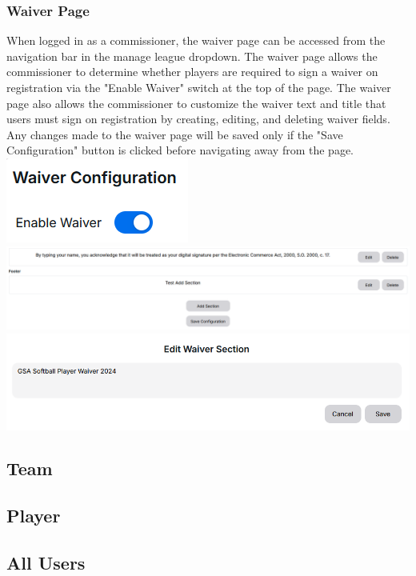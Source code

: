 \documentclass{article}
\begin{document}
            \subsubsection{Waiver Page}
                When logged in as a commissioner, the waiver page can be accessed
                from the navigation bar in the manage league dropdown. The waiver page 
                allows the commissioner to determine whether players are required to sign
                a waiver on registration via the "Enable Waiver" switch at the top of the 
                page. The waiver page also allows the commissioner to customize the waiver
                text and title that users must sign on registration by creating, editing, and
                deleting waiver fields. Any changes made to the waiver page will be saved only 
                if the "Save Configuration" button is clicked before navigating away from the 
                page.
                \newline \includegraphics[scale=0.6]{enable-waiver.png}
                \newline \includegraphics[scale=0.4]{waiver-management.png}
                \newline \includegraphics[scale=0.6]{edit-waiver.png}
            \subsubsection{}
    \subsection{Team}
    \subsection{Player}
    \subsection{All Users}
\end{document}
